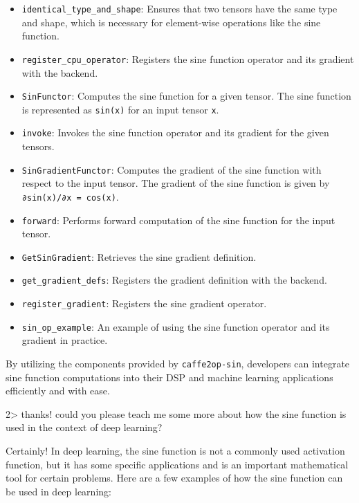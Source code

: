 \documentclass[
]{article}
\providecommand{\tightlist}{%
  \setlength{\itemsep}{0pt}\setlength{\parskip}{0pt}}
\begin{document}
\begin{itemize}
\tightlist
\item
  \texttt{identical\_type\_and\_shape}: Ensures that two tensors have
  the same type and shape, which is necessary for element-wise
  operations like the sine function.
\item
  \texttt{register\_cpu\_operator}: Registers the sine function operator
  and its gradient with the backend.
\item
  \texttt{SinFunctor}: Computes the sine function for a given tensor.
  The sine function is represented as \texttt{sin(x)} for an input
  tensor \texttt{x}.
\item
  \texttt{invoke}: Invokes the sine function operator and its gradient
  for the given tensors.
\item
  \texttt{SinGradientFunctor}: Computes the gradient of the sine
  function with respect to the input tensor. The gradient of the sine
  function is given by \texttt{∂sin(x)/∂x\ =\ cos(x)}.
\item
  \texttt{forward}: Performs forward computation of the sine function
  for the input tensor.
\item
  \texttt{GetSinGradient}: Retrieves the sine gradient definition.
\item
  \texttt{get\_gradient\_defs}: Registers the gradient definition with
  the backend.
\item
  \texttt{register\_gradient}: Registers the sine gradient operator.
\item
  \texttt{sin\_op\_example}: An example of using the sine function
  operator and its gradient in practice.
\end{itemize}

By utilizing the components provided by \texttt{caffe2op-sin},
developers can integrate sine function computations into their DSP and
machine learning applications efficiently and with ease.

2\textgreater{} thanks! could you please teach me some more about how
the sine function is used in the context of deep learning?

Certainly! In deep learning, the sine function is not a commonly used
activation function, but it has some specific applications and is an
important mathematical tool for certain problems. Here are a few
examples of how the sine function can be used in deep learning:
\end{document}
